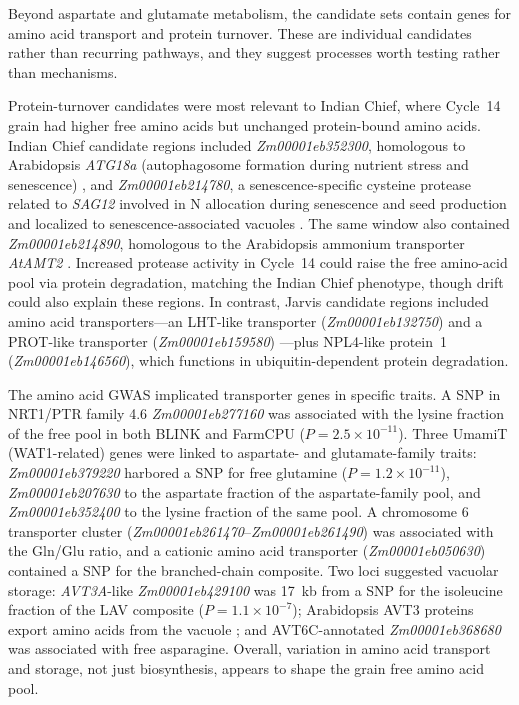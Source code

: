 Beyond aspartate and glutamate metabolism, the candidate sets contain genes for amino acid transport and protein turnover. These are individual candidates rather than recurring pathways, and they suggest processes worth testing rather than mechanisms.

Protein-turnover candidates were most relevant to Indian Chief, where Cycle~14 grain had higher free amino acids but unchanged protein-bound amino acids. Indian Chief candidate regions included \textit{Zm00001eb352300}, homologous to Arabidopsis \textit{ATG18a} (autophagosome formation during nutrient stress and senescence) \citep{Xiong2005ATG18a}, and \textit{Zm00001eb214780}, a senescence-specific cysteine protease related to \textit{SAG12} involved in N allocation during senescence and seed production \citep{James2018SAG12} and localized to senescence-associated vacuoles \citep{Otegui2005SAV}. The same window also contained \textit{Zm00001eb214890}, homologous to the Arabidopsis ammonium transporter \textit{AtAMT2} \citep{Neuhaeuser2009AtAMT2}. Increased protease activity in Cycle~14 could raise the free amino-acid pool via protein degradation, matching the Indian Chief phenotype, though drift could also explain these regions. In contrast, Jarvis candidate regions included amino acid transporters—an LHT-like transporter (\textit{Zm00001eb132750}) \citep{Fan2023LHT} and a PROT-like transporter (\textit{Zm00001eb159580}) \citep{Lehmann2011ProT}—plus NPL4-like protein~1 (\textit{Zm00001eb146560}), which functions in ubiquitin-dependent protein degradation.

The amino acid GWAS implicated transporter genes in specific traits. A SNP in NRT1/PTR family 4.6 \textit{Zm00001eb277160} was associated with the lysine fraction of the free pool in both BLINK and FarmCPU ($P = 2.5 \times 10^{-11}$). Three UmamiT (WAT1-related) genes were linked to aspartate- and glutamate-family traits: \textit{Zm00001eb379220} harbored a SNP for free glutamine ($P = 1.2 \times 10^{-11}$), \textit{Zm00001eb207630} to the aspartate fraction of the aspartate-family pool, and \textit{Zm00001eb352400} to the lysine fraction of the same pool. A chromosome 6 transporter cluster (\textit{Zm00001eb261470}--\textit{Zm00001eb261490}) was associated with the Gln/Glu ratio, and a cationic amino acid transporter (\textit{Zm00001eb050630}) contained a SNP for the branched-chain composite. Two loci suggested vacuolar storage: \textit{AVT3A}-like \textit{Zm00001eb429100} was 17~kb from a SNP for the isoleucine fraction of the LAV composite ($P = 1.1 \times 10^{-7}$); Arabidopsis AVT3 proteins export amino acids from the vacuole \citep{Fujiki2017AtAVT3}; and AVT6C-annotated \textit{Zm00001eb368680} was associated with free asparagine. Overall, variation in amino acid transport and storage, not just biosynthesis, appears to shape the grain free amino acid pool.


